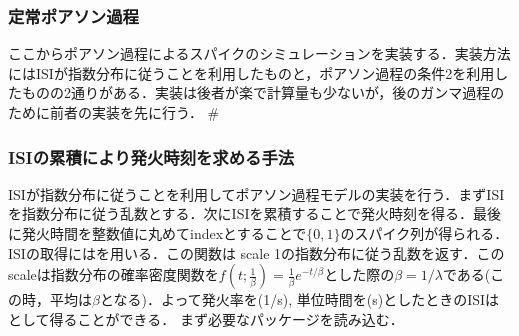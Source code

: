 \subsubsection{定常ポアソン過程}ここからポアソン過程によるスパイクのシミュレーションを実装する．実装方法にはISIが指数分布に従うことを利用したものと，ポアソン過程の条件2を利用したものの2通りがある．実装は後者が楽で計算量も少ないが，後のガンマ過程のために前者の実装を先に行う．
#\subsubsection{ISIの累積により発火時刻を求める手法}ISIが指数分布に従うことを利用してポアソン過程モデルの実装を行う．まずISIを指数分布に従う乱数とする．次にISIを累積することで発火時刻を得る．最後に発火時間を整数値に丸めてindexとすることで$\{0, 1\}$のスパイク列が得られる．ISIの取得にはを用いる．この関数は scale 1の指数分布に従う乱数を返す．このscaleは指数分布の確率密度関数を$f(t; \frac{1}{\beta}) = \frac{1}{\beta} e^{-t/\beta}$とした際の$\beta = 1/\lambda$である(この時，平均は$\beta$となる)．よって発火率を(1/s), 単位時間を(s)としたときのISIは として得ることができる．
まず必要なパッケージを読み込む．